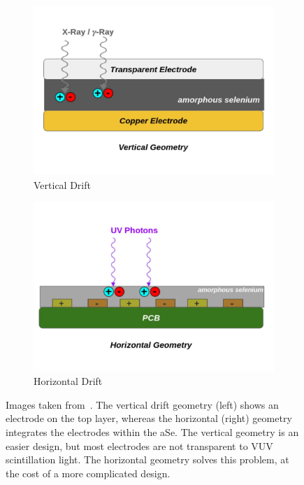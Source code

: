 \begin{figure}[]
\centering
\begin{subfigure}{.45\textwidth}
  \centering
  \includegraphics[width=\textwidth]{images/qpix_light_vertical_geom.pdf}
  \caption{Vertical Drift}
\end{subfigure}%
\begin{subfigure}{.45\textwidth}
  \centering
  \includegraphics[width=\textwidth]{images/qpix_light_horizontal_geom.pdf}
  \caption{Horizontal Drift}
\end{subfigure}
\caption{Images taken from~\citep{https://doi.org/10.48550/arxiv.2207.11127}.
The vertical drift geometry (left) shows an electrode on the top layer, whereas the horizontal (right) geometry integrates the electrodes within the aSe.
The vertical geometry is an easier design, but most electrodes are not transparent to VUV scintillation light.
The horizontal geometry solves this problem, at the cost of a more complicated design.
}
\label{fig:qpix_light_geometries}
\end{figure}

